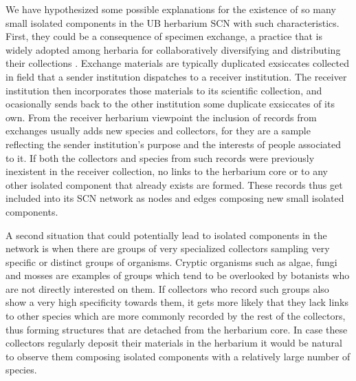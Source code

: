 We have hypothesized some possible explanations for the existence of so many small isolated components in the UB herbarium SCN with such characteristics. First, they could be a consequence of specimen exchange, a practice that is widely adopted among herbaria for collaboratively diversifying and distributing their collections \cite{Groom2014}. Exchange materials are typically duplicated exsiccates collected in field that a sender institution dispatches to a receiver institution. The receiver institution then incorporates those materials to its scientific collection, and ocasionally sends back to the other institution some duplicate exsiccates of its own.
From the receiver herbarium viewpoint the inclusion of records from exchanges usually adds new species and collectors, for they are a sample reflecting the sender institution's purpose and the interests of people associated to it. If both the collectors and species from such records were previously inexistent in the receiver collection, no links to the herbarium core or to any other isolated component that already exists are formed. These records thus get included into its SCN network as nodes and edges composing new small isolated components.

A second situation that could potentially lead to isolated components in the network is when there are groups of very specialized collectors sampling very specific or distinct groups of organisms. Cryptic organisms such as algae, fungi and mosses are examples of groups which tend to be overlooked by botanists who are not directly interested on them. If collectors who record such groups also show a very high specificity towards them, it gets more likely that they lack links to other species which are more commonly recorded by the rest of the collectors, thus forming structures that are detached from the herbarium core. In case these collectors regularly deposit their materials in the herbarium it would be natural to observe them composing isolated components with a relatively large number of species.




